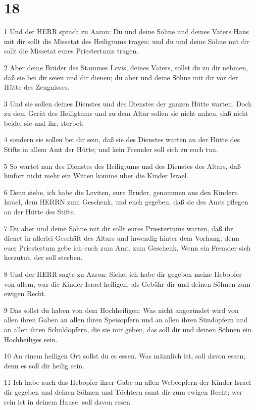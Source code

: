 \chapter{18}

\par 1 Und der HERR sprach zu Aaron: Du und deine Söhne und deines Vaters Haus mit dir sollt die Missetat des Heiligtums tragen; und du und deine Söhne mit dir sollt die Missetat eures Priestertums tragen.
\par 2 Aber deine Brüder des Stammes Levis, deines Vaters, sollst du zu dir nehmen, daß sie bei dir seien und dir dienen; du aber und deine Söhne mit dir vor der Hütte des Zeugnisses.
\par 3 Und sie sollen deines Dienstes und des Dienstes der ganzen Hütte warten. Doch zu dem Gerät des Heiligtums und zu dem Altar sollen sie nicht nahen, daß nicht beide, sie und ihr, sterbet;
\par 4 sondern sie sollen bei dir sein, daß sie des Dienstes warten an der Hütte des Stifts in allem Amt der Hütte; und kein Fremder soll sich zu euch tun.
\par 5 So wartet nun des Dienstes des Heiligtums und des Dienstes des Altars, daß hinfort nicht mehr ein Wüten komme über die Kinder Israel.
\par 6 Denn siehe, ich habe die Leviten, eure Brüder, genommen aus den Kindern Israel, dem HERRN zum Geschenk, und euch gegeben, daß sie des Amts pflegen an der Hütte des Stifts.
\par 7 Du aber und deine Söhne mit dir sollt eures Priestertums warten, daß ihr dienet in allerlei Geschäft des Altars und inwendig hinter dem Vorhang; denn euer Priestertum gebe ich euch zum Amt, zum Geschenk. Wenn ein Fremder sich herzutut, der soll sterben.
\par 8 Und der HERR sagte zu Aaron: Siehe, ich habe dir gegeben meine Hebopfer von allem, was die Kinder Israel heiligen, als Gebühr dir und deinen Söhnen zum ewigen Recht.
\par 9 Das sollst du haben von dem Hochheiligen: Was nicht angezündet wird von allen ihren Gaben an allen ihren Speisopfern und an allen ihren Sündopfern und an allen ihren Schuldopfern, die sie mir geben, das soll dir und deinen Söhnen ein Hochheiliges sein.
\par 10 An einem heiligen Ort sollst du es essen. Was männlich ist, soll davon essen; denn es soll dir heilig sein.
\par 11 Ich habe auch das Hebopfer ihrer Gabe an allen Webeopfern der Kinder Israel dir gegeben und deinen Söhnen und Töchtern samt dir zum ewigen Recht; wer rein ist in deinem Hause, soll davon essen.
